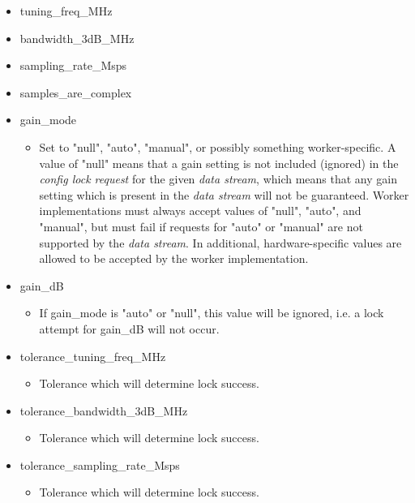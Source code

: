 \documentclass{article}
\begin{document}
\begin{itemize}
\begin{itemize}
\begin{itemize}
            \item tuning\_freq\_MHz
            \item bandwidth\_3dB\_MHz
            \item sampling\_rate\_Msps
            \item samples\_are\_complex
            \item gain\_mode
              \begin{itemize}
                \item Set to "null", "auto", "manual", or possibly something
                      worker-specific.
                      A value of "null" means that a gain setting is not
                      included (ignored)
                      in the \textit{config lock request}
                      for the given \textit{data stream}, which means that
                      any gain setting which is present in the
                      \textit{data stream} will not be guaranteed.
                      Worker implementations must always accept values of
                      "null", "auto", and "manual", but must fail if requests
                      for "auto" or "manual" are not supported by the
                      \textit{data stream}.
                      In additional, hardware-specific values are allowed to be
                      accepted by the worker implementation.
              \end{itemize}

            \item gain\_dB
              \begin{itemize}
                \item If gain\_mode is "auto" or "null", this value will be ignored, i.e. a
                lock attempt for gain\_dB will not occur.
              \end{itemize}

            \item tolerance\_tuning\_freq\_MHz
              \begin{itemize}
                \item Tolerance which will determine lock success.
              \end{itemize}
            \item tolerance\_bandwidth\_3dB\_MHz
              \begin{itemize}
                \item Tolerance which will determine lock success.
              \end{itemize}
            \item tolerance\_sampling\_rate\_Msps
              \begin{itemize}
                \item Tolerance which will determine lock success.
              \end{itemize}


\end{itemize}
\end{itemize}
\end{itemize}
\end{document}
